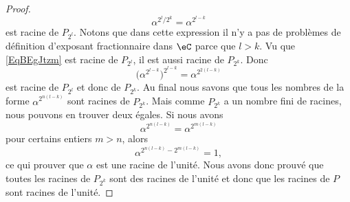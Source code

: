 \begin{proof}
    \begin{equation}    \label{EqBEgJtzm}
        \alpha^{2^l/2^k}=\alpha^{2^{l-k}}
    \end{equation}
    est racine de \( P_{2^l}\). Notons que dans cette expression il n'y a pas de problèmes de définition d'exposant fractionnaire dans \( \eC\) parce que \( l>k\). Vu que \eqref{EqBEgJtzm} est racine de \( P_{2^l}\), il est aussi racine de \( P_{2^k}\). Donc
    \begin{equation}
        \big( \alpha^{2^{l-k}} \big)^{2^{l-k}}=\alpha^{2^{2(l-k)}}
    \end{equation}
    est racine de \( P_{2^l}\) et donc de \( P_{2^k}\). Au final nous savons que tous les nombres de la forme \( \alpha^{2^{n(l-k)}}\) sont racines de \( P_{2^k}\). Mais comme \( P_{2^k}\) a un nombre fini de racines, nous pouvons en trouver deux égales. Si nous avons
    \begin{equation}
        \alpha^{2^{n(l-k)}}=\alpha^{2^{m(l-k)}}
    \end{equation}
    pour certains entiers \( m>n\), alors
    \begin{equation}
        \alpha^{2^{n(l-k)}-2^{m(l-k)}}=1,
    \end{equation}
    ce qui prouver que \( \alpha\) est une racine de l'unité. Nous avons donc prouvé que toutes les racines de \( P_{2^k}\) sont des racines de l'unité et donc que les racines de \( P\) sont racines de l'unité.
\end{proof}
